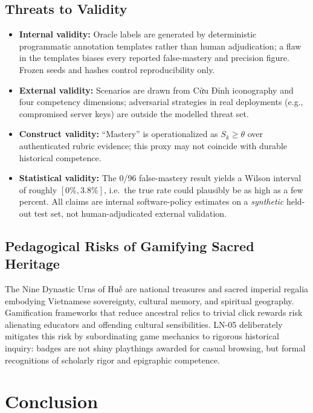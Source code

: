 \documentclass[11pt,a4paper]{article}
\begin{document}
\subsection{Threats to Validity}

\begin{itemize}[leftmargin=*]
    \item \textbf{Internal validity:} Oracle labels are generated by deterministic programmatic annotation templates rather than human adjudication; a flaw in the templates biases every reported false-mastery and precision figure. Frozen seeds and hashes control reproducibility only.
    \item \textbf{External validity:} Scenarios are drawn from Cửu Đỉnh iconography and four competency dimensions; adversarial strategies in real deployments (e.g., compromised server keys) are outside the modelled threat set.
    \item \textbf{Construct validity:} ``Mastery'' is operationalized as $S_k \ge \theta$ over authenticated rubric evidence; this proxy may not coincide with durable historical competence.
    \item \textbf{Statistical validity:} The 0/96 false-mastery result yields a Wilson interval of roughly $[0\%, 3.8\%]$, i.e.\ the true rate could plausibly be as high as a few percent. All claims are internal software-policy estimates on a \emph{synthetic} held-out test set, not human-adjudicated external validation.
\end{itemize}

\subsection{Pedagogical Risks of Gamifying Sacred Heritage}
The Nine Dynastic Urns of Huế are national treasures and sacred imperial regalia embodying Vietnamese sovereignty, cultural memory, and spiritual geography. Gamification frameworks that reduce ancestral relics to trivial click rewards risk alienating educators and offending cultural sensibilities. LN-05 deliberately mitigates this risk by subordinating game mechanics to rigorous historical inquiry: badges are not shiny playthings awarded for casual browsing, but formal recognitions of scholarly rigor and epigraphic competence.

\section{Conclusion}
\end{document}
